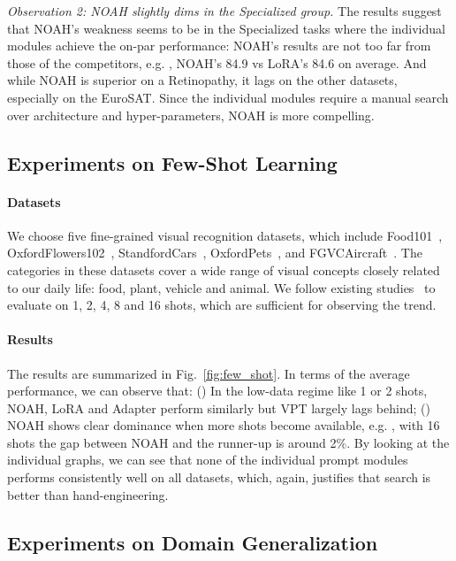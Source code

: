 \emph{Observation 2: NOAH slightly dims in the Specialized group.} The results suggest that NOAH's weakness seems to be in the Specialized tasks where the individual modules achieve the on-par performance: NOAH's results are not too far from those of the competitors, e.g. , NOAH's 84.9 vs LoRA's 84.6 on average. And while NOAH is superior on a Retinopathy, it lags on the other datasets, especially on the EuroSAT. Since the individual modules require a manual search over architecture and hyper-parameters, NOAH is more compelling.

\subsection{Experiments on Few-Shot Learning}
\label{sec:exp;subsec:fewshot}

\paragraph{Datasets}
We choose five fine-grained visual recognition datasets, which include Food101~\cite{bossard2014food}, OxfordFlowers102~\cite{nilsback2006visual}, StandfordCars~\cite{krause20133d}, OxfordPets~\cite{parkhi2012cats}, and FGVCAircraft~\cite{maji2013fine}. The categories in these datasets cover a wide range of visual concepts closely related to our daily life: food, plant, vehicle and animal. We follow existing studies~\cite{zhou2021learning,radford2021learning} to evaluate on 1, 2, 4, 8 and 16 shots, which are sufficient for observing the trend.

\paragraph{Results}
The results are summarized in Fig.~\ref{fig:few_shot}. In terms of the average performance, we can observe that: () In the low-data regime like 1 or 2 shots, NOAH, LoRA and Adapter perform similarly but VPT largely lags behind; () NOAH shows clear dominance when more shots become available, e.g. , with 16 shots the gap between NOAH and the runner-up is around 2\%. By looking at the individual graphs, we can see that none of the individual prompt modules performs consistently well on all datasets, which, again, justifies that search is better than hand-engineering.

\subsection{Experiments on Domain Generalization}
\label{sec:exp;subsec:dg}

